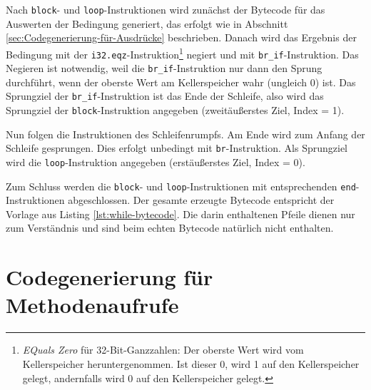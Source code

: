 Nach \lstinline{block}- und \lstinline{loop}-Instruktionen wird zunächst der Bytecode für das Auswerten der Bedingung generiert, das erfolgt wie in Abschnitt \ref{sec:Codegenerierung-für-Ausdrücke} beschrieben. Danach wird das Ergebnis der Bedingung mit der \lstinline{i32.eqz}-Instruktion\footnote{\emph{EQuals Zero} für 32-Bit-Ganzzahlen: Der oberste Wert wird vom Kellerspeicher heruntergenommen. Ist dieser 0, wird 1 auf den Kellerspeicher gelegt, andernfalls wird 0 auf den Kellerspeicher gelegt.} negiert und mit \lstinline{br_if}-Instruktion. Das Negieren ist notwendig, weil die \lstinline{br_if}-Instruktion nur dann den Sprung durchführt, wenn der oberste Wert am Kellerspeicher wahr (ungleich 0) ist. Das Sprungziel der \lstinline{br_if}-Instruktion ist das Ende der Schleife, also wird das Sprungziel der \lstinline{block}-Instruktion angegeben (zweitäußerstes Ziel, Index = 1).

Nun folgen die Instruktionen des Schleifenrumpfs. Am Ende wird zum Anfang der Schleife gesprungen. Dies erfolgt unbedingt mit \lstinline{br}-Instruktion. Als Sprungziel wird die \lstinline{loop}-Instruktion angegeben (erstäußerstes Ziel, Index = 0).

Zum Schluss werden die \lstinline{block}- und \lstinline{loop}-Instruktionen mit entsprechenden \lstinline{end}-In\-struk\-ti\-onen abgeschlossen. Der gesamte erzeugte Bytecode entspricht der Vorlage aus Listing \ref{lst:while-bytecode}. Die darin enthaltenen Pfeile dienen nur zum Verständnis und sind beim echten Bytecode natürlich nicht enthalten.



\section{Codegenerierung für Methodenaufrufe}
\label{sec:Codegenerierung-für-Methodenaufrufe}


